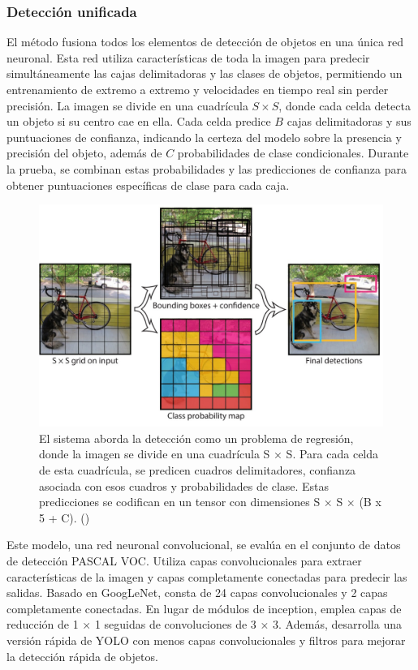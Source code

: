 \subsubsection{Detección unificada}
El método fusiona todos los elementos de detección de objetos en una única red neuronal. Esta red utiliza características de toda la imagen para predecir simultáneamente las cajas delimitadoras y las clases de objetos, permitiendo un entrenamiento de extremo a extremo y velocidades en tiempo real sin perder precisión. La imagen se divide en una cuadrícula $S \times S$, donde cada celda detecta un objeto si su centro cae en ella. Cada celda predice $B$ cajas delimitadoras y sus puntuaciones de confianza, indicando la certeza del modelo sobre la presencia y precisión del objeto, además de $C$ probabilidades de clase condicionales. Durante la prueba, se combinan estas probabilidades y las predicciones de confianza para obtener puntuaciones específicas de clase para cada caja.

\begin{figure}[H]
	\begin{center}
		\includegraphics[width=1\textwidth]{2/figures/yolo2.jpeg}
		\caption{El sistema aborda la detección como un problema de regresión, donde la imagen se divide en una cuadrícula S × S. Para cada celda de esta cuadrícula, se predicen cuadros delimitadores, confianza asociada con esos cuadros y probabilidades de clase. Estas predicciones se codifican en un tensor con dimensiones S × S × (B x 5 + C). (\cite{tecnica4})}
	\end{center}
\end{figure}

Este modelo, una red neuronal convolucional, se evalúa en el conjunto de datos de detección PASCAL VOC. Utiliza capas convolucionales para extraer características de la imagen y capas completamente conectadas para predecir las salidas. Basado en GoogLeNet, consta de 24 capas convolucionales y 2 capas completamente conectadas. En lugar de módulos de inception, emplea capas de reducción de 1 × 1 seguidas de convoluciones de 3 × 3. Además, desarrolla una versión rápida de YOLO con menos capas convolucionales y filtros para mejorar la detección rápida de objetos.

